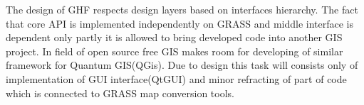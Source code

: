 \documentclass[a4paper,12pt,oneside]{report}
\begin{document}
The design of GHF respects design layers based on interfaces hierarchy. The fact that core API is implemented independently on GRASS and middle interface is dependent only partly it is allowed to bring developed code into another GIS project. In field of open source free GIS makes room for developing of similar framework for Quantum GIS(QGis). Due to design this task will consists only of implementation of GUI interface(QtGUI) and minor refracting of part of code which is connected to GRASS map conversion tools.

	
	
	\chapter*{}
		\listoffigures
		 
		\listoftables
	
	
\end{document}
